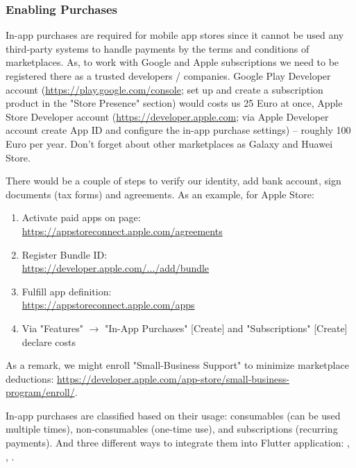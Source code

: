 \subsubsection{Enabling Purchases}

In-app purchases are required for mobile app stores since it cannot be used any third-party systems to handle payments
by the terms and conditions of marketplaces. As, to work with Google and Apple subscriptions we need to be registered 
there as a trusted developers / companies. Google Play Developer account 
(\href{https://play.google.com/console}{https://play.google.com/console}; set up and create a subscription product in 
the "Store Presence" section) would costs us 25 Euro at once, Apple Store Developer account 
(\href{https://developer.apple.com}{https://developer.apple.com}; via Apple Developer account create App ID and 
configure the in-app purchase settings) -- roughly 100 Euro per year. Don't forget about other marketplaces as 
Galaxy and Huawei Store.

There would be a couple of steps to verify our identity, add bank account, sign documents (tax forms) and agreements.
As an example, for Apple Store:
\begin{enumerate}
  \item Activate paid apps on page:\\
  \href{https://appstoreconnect.apple.com/agreements}{https://appstoreconnect.apple.com/agreements}
  \item Register Bundle ID:\\
  \href{https://developer.apple.com/account/resources/identifiers/bundleId/add/bundle}{https://developer.apple.com/.../add/bundle}
  \item Fulfill app definition:\\
  \href{https://appstoreconnect.apple.com/apps}{https://appstoreconnect.apple.com/apps}
  \item Via "Features" $\rightarrow$ "In-App Purchases" [Create] and "Subscriptions" [Create] declare costs
\end{enumerate}

\noindent As a remark, we might enroll "Small-Business Support" to minimize marketplace deductions:
\href{https://developer.apple.com/app-store/small-business-program/enroll/}{https://developer.apple.com/app-store/small-business-program/enroll/}.

In-app purchases are classified based on their usage: consumables (can be used multiple times), non-consumables 
(one-time use), and subscriptions (recurring payments). And three different ways to integrate them into Flutter 
application: , , . \\
\\


\noindent {}
